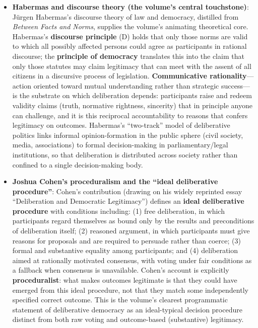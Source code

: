 \documentclass[12pt]{article}
\begin{document}
\begin{itemize}[leftmargin=*, itemsep=4pt]
    \item \textbf{Habermas and discourse theory (the volume's central touchstone)}: Jürgen Habermas's discourse theory of law and democracy, distilled from \textit{Between Facts and Norms}, supplies the volume's animating theoretical core. Habermas's \textbf{discourse principle} (D) holds that only those norms are valid to which all possibly affected persons could agree as participants in rational discourse; the \textbf{principle of democracy} translates this into the claim that only those statutes may claim legitimacy that can meet with the assent of all citizens in a discursive process of legislation. \textbf{Communicative rationality}---action oriented toward mutual understanding rather than strategic success---is the substrate on which deliberation depends: participants raise and redeem validity claims (truth, normative rightness, sincerity) that in principle anyone can challenge, and it is this reciprocal accountability to reasons that confers legitimacy on outcomes. Habermas's ``two-track'' model of deliberative politics links informal opinion-formation in the public sphere (civil society, media, associations) to formal decision-making in parliamentary/legal institutions, so that deliberation is distributed across society rather than confined to a single decision-making body.
    \item \textbf{Joshua Cohen's proceduralism and the ``ideal deliberative procedure''}: Cohen's contribution (drawing on his widely reprinted essay ``Deliberation and Democratic Legitimacy'') defines an \textbf{ideal deliberative procedure} with conditions including: (1) free deliberation, in which participants regard themselves as bound only by the results and preconditions of deliberation itself; (2) reasoned argument, in which participants must give reasons for proposals and are required to persuade rather than coerce; (3) formal and substantive equality among participants; and (4) deliberation aimed at rationally motivated consensus, with voting under fair conditions as a fallback when consensus is unavailable. Cohen's account is explicitly \textbf{proceduralist}: what makes outcomes legitimate is that they could have emerged from this ideal procedure, not that they match some independently specified correct outcome. This is the volume's clearest programmatic statement of deliberative democracy as an ideal-typical decision procedure distinct from both raw voting and outcome-based (substantive) legitimacy.

\end{itemize}
\end{document}
